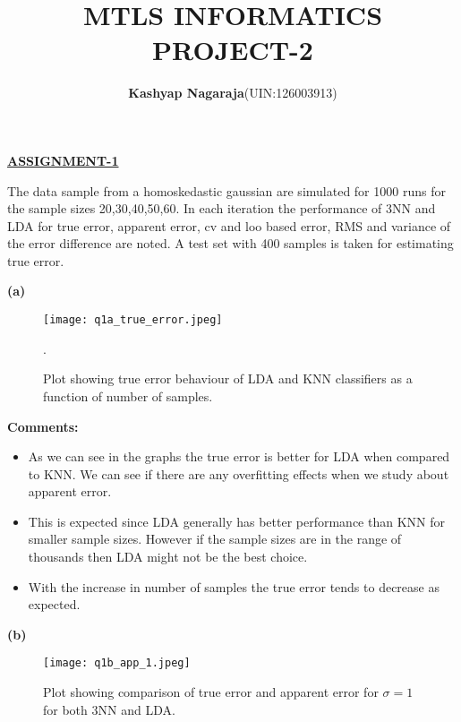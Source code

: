 \documentclass[paper=a4, fontsize=11pt]{scrartcl} %
\title{\Huge MTLS INFORMATICS PROJECT-2}
\author{\LARGE \textbf{Kashyap Nagaraja}\hspace{0.4 cm}(UIN:126003913)}
\begin{document}
	

\maketitle
\huge		
\begin{center}
\textbf{\underline{ASSIGNMENT-1}}
\end{center}
\normalsize
The data sample from a homoskedastic gaussian are simulated for 1000 runs for the sample sizes 20,30,40,50,60. In each iteration the performance of 3NN and LDA for true error, apparent error, cv and loo based error, RMS and variance of the error difference are noted. A test set with 400 samples is taken for estimating true error.
\newline

\textbf{(a)}
\begin{center}

\begin{figure}[H]
\hspace{2 cm}
\texttt{[image: q1a\_true\_error.jpeg]} 
\caption{Plot showing true error behaviour of LDA and KNN classifiers as a function of number of samples.}.

\end{figure}
\end{center}
\newpage
\textbf{Comments:}
\newline
\begin{itemize}
\item As we can see in the graphs the true error is better for LDA when compared to KNN. We can see if there are any overfitting effects when we study about apparent error.
\item This is expected since LDA generally has better performance than KNN for smaller sample sizes. However if the sample sizes are in the range of thousands then LDA might not be the best choice.
\item With the increase in number of samples the true error tends to decrease as expected.
\end{itemize}


\textbf{(b)}
\begin{center}
\begin{figure}[H]
\hspace{2 cm}
\texttt{[image: q1b\_app\_1.jpeg]} 
\caption{Plot showing comparison of true error and apparent error for $\sigma=1$ for both 3NN and LDA.}

\end{figure}
\end{center}
\newpage
\end{document}
